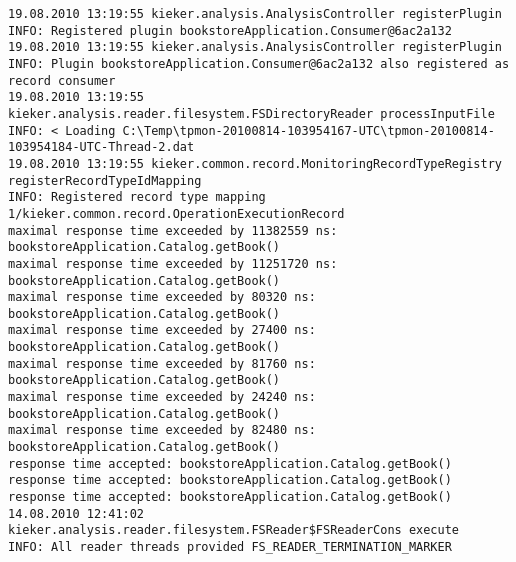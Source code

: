 \setBashListing
\begin{lstlisting}[caption=Execution of the example analysis (Section~\ref{sec:example:analysis})]
19.08.2010 13:19:55 kieker.analysis.AnalysisController registerPlugin
INFO: Registered plugin bookstoreApplication.Consumer@6ac2a132
19.08.2010 13:19:55 kieker.analysis.AnalysisController registerPlugin
INFO: Plugin bookstoreApplication.Consumer@6ac2a132 also registered as record consumer
19.08.2010 13:19:55 kieker.analysis.reader.filesystem.FSDirectoryReader processInputFile
INFO: < Loading C:\Temp\tpmon-20100814-103954167-UTC\tpmon-20100814-103954184-UTC-Thread-2.dat
19.08.2010 13:19:55 kieker.common.record.MonitoringRecordTypeRegistry registerRecordTypeIdMapping
INFO: Registered record type mapping 1/kieker.common.record.OperationExecutionRecord
maximal response time exceeded by 11382559 ns: bookstoreApplication.Catalog.getBook()
maximal response time exceeded by 11251720 ns: bookstoreApplication.Catalog.getBook()
maximal response time exceeded by 80320 ns: bookstoreApplication.Catalog.getBook()
maximal response time exceeded by 27400 ns: bookstoreApplication.Catalog.getBook()
maximal response time exceeded by 81760 ns: bookstoreApplication.Catalog.getBook()
maximal response time exceeded by 24240 ns: bookstoreApplication.Catalog.getBook()
maximal response time exceeded by 82480 ns: bookstoreApplication.Catalog.getBook()
response time accepted: bookstoreApplication.Catalog.getBook()
response time accepted: bookstoreApplication.Catalog.getBook()
response time accepted: bookstoreApplication.Catalog.getBook()
14.08.2010 12:41:02 kieker.analysis.reader.filesystem.FSReader$FSReaderCons execute
INFO: All reader threads provided FS_READER_TERMINATION_MARKER
\end{lstlisting}